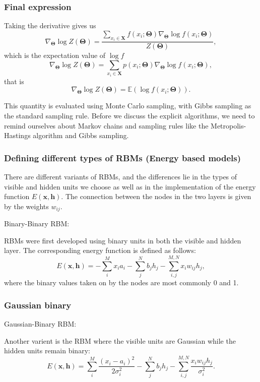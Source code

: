 \documentclass{beamer}
\begin{document}
\begin{frame}
\frametitle{Final expression}

Taking the derivative gives us
\[
\nabla_{\bm{\Theta}}\log{Z(\bm{\Theta})}=\frac{ \sum_{x_i\in \bm{X}}f(x_i;\bm{\Theta}) \nabla_{\bm{\Theta}}\log{f(x_i;\bm{\Theta})}   }{Z(\bm{\Theta})}, 
\]
which is the expectation value of $\log{f}$
\[
\nabla_{\bm{\Theta}}\log{Z(\bm{\Theta})}=\sum_{x_i\in \bm{X}}p(x_i;\bm{\Theta}) \nabla_{\bm{\Theta}}\log{f(x_i;\bm{\Theta})},
\]
that is
\[
\nabla_{\bm{\Theta}}\log{Z(\bm{\Theta})}=\mathbb{E}(\log{f(x_i;\bm{\Theta})}).
\]

This quantity is evaluated using Monte Carlo sampling, with Gibbs
sampling as the standard sampling rule.  Before we discuss the
explicit algorithms, we need to remind ourselves about Markov chains
and sampling rules like the Metropolis-Hastings algorithm and Gibbs
sampling.
\end{frame}

\begin{frame}
\frametitle{Defining different types of RBMs (Energy based models)}

There are different variants of RBMs, and the differences lie in the types of visible and hidden units we choose as well as in the implementation of the energy function $E(\bm{x},\bm{h})$. The connection between the nodes in the two layers is given by the weights $w_{ij}$. 

\begin{block}{Binary-Binary RBM: }

RBMs were first developed using binary units in both the visible and hidden layer. The corresponding energy function is defined as follows:
\[
	E(\bm{x}, \bm{h}) = - \sum_i^M x_i a_i- \sum_j^N b_j h_j - \sum_{i,j}^{M,N} x_i w_{ij} h_j,
\]
where the binary values taken on by the nodes are most commonly 0 and 1.
\end{block}
\end{frame}

\begin{frame}
\frametitle{Gaussian binary}

\begin{block}{Gaussian-Binary RBM: }

Another varient is the RBM where the visible units are Gaussian while the hidden units remain binary:
\[
	E(\bm{x}, \bm{h}) = \sum_i^M \frac{(x_i - a_i)^2}{2\sigma_i^2} - \sum_j^N b_j h_j - \sum_{i,j}^{M,N} \frac{x_i w_{ij} h_j}{\sigma_i^2}. 
\]
\end{block}
\end{frame}
\end{document}
